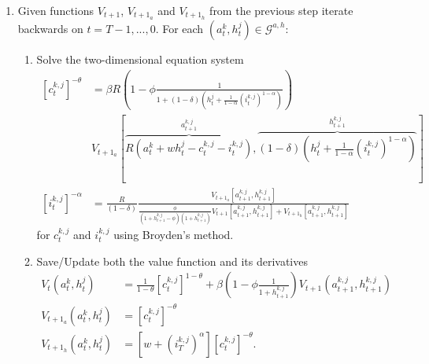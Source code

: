 \documentclass[a4paper,12pt]{article}
\begin{document}
\begin{enumerate}
	\item Given functions $V_{t+1}$, $V_{t+1_{a}}$ and $V_{t+1_{h}}$ from the previous step iterate backwards on $t=T-1,...,0$. For each $\left(a_{t}^{k},h_{t}^{j}\right) \in \mathcal{G}^{a,h}$:

	\begin{enumerate}
		\item \label{EXGM interp} Solve the two-dimensional equation system
		\begin{align*}
		\left[c_{t}^{k,j}\right]^{-\theta}  &  = \beta R \left(1 - \phi \frac{1} {1 + \left(1 - \delta\right) \left(h_{t}^{j} + \frac{1} {1 - \alpha}\left(i_{t}^{k,j}\right)^{1-\alpha}\right)}\right)  \\
				&  \text{$V_{t+1_{a}}$}\left[\overset{a_{t+1}^{k,j}}{\overbrace{R\left(a_{t}^{k} + w h_{t}^{j} - c_{t}^{k,j} - i_{t}^{k,j}\right)}},\overset{h_{t+1}^{k,j}}{\overbrace{\left(1 - \delta\right) \left(h_{t}^{j} + \frac{1} {1 - \alpha}\left(i_{t}^{k,j}\right)^{1 - \alpha}\right)}}\right]  \\
		\left[i_{t}^{k,j}\right]^{-\alpha}  &  = \frac{R} {\left(1 - \delta\right)} \frac{\text{$V_{t+1_{a}}$}\left[a_{t+1}^{k,j},h_{t+1}^{k,j}\right]} {\frac{\phi}{\left(1 + h_{t+1}^{k,j} - \phi\right) \left(1+h_{t+1}^{k,j}\right)}V_{t+1}\left[a_{t+1}^{k,j},h_{t+1}^{k,j}\right] + \text{$V_{t+1_{h}}$}\left[a_{t+1}^{k,j},h_{t+1}^{k,j}\right]}
		\end{align*}
		for $c_{t}^{k,j}$ and $i_{t}^{k,j}$ using Broyden's method.

		\item Save/Update both the value function and its derivatives
		\begin{align*}
		V_{t}\left(a_{t}^{k},h_{t}^{j}\right)  &  = \frac{1} {1 - \theta} \left[c_{t}^{k,j}\right]^{1 - \theta} + \beta \left(1 - \phi \frac{1} {1 + h_{t+1}^{k,j}}\right) V_{t+1}(a_{t+1}^{k,j},h_{t+1}^{k,j})  \\
		\text{$V_{t+1_{a}}$}\left(a_{t}^{k},h_{t}^{j}\right)  &  = \left[c_{t}^{k,j}\right]^{-\theta}  \\
		\text{$V_{t+1_{h}}$}\left(a_{t}^{k},h_{t}^{j}\right)  &  = \left[w + \left(i_{T}^{k,j}\right)^{\alpha}\right] \left[c_{t}^{k,j}\right]^{-\theta}  \text{.}
		\end{align*}

	\end{enumerate}
\end{enumerate}
\end{document}
